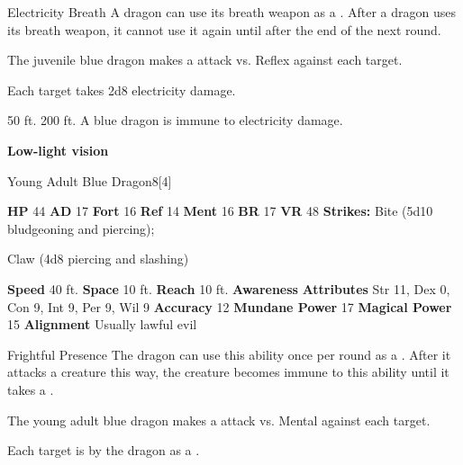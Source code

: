     \begin{freeability}{Electricity Breath}
      A dragon can use its breath weapon as a .
      After a dragon uses its breath weapon, it cannot use it again until after the end of the next round.
      \par The juvenile blue dragon makes a  attack
        vs. Reflex against each target.
    
    \hit Each target takes 2d8 electricity damage.
    \end{freeability}
  
      
       50 ft.
     200 ft.
     A blue dragon is immune to electricity damage.
    \par\noindent\textbf{Low-light vision}
  

  \begin{monsubsection}{Young Adult Blue Dragon}{8}[4]
    \vspace{-1em}\vspace{-1em}
    \vspace{0em}

    
    

    \begin{spellcontent}
      \begin{spelltargetinginfo}
        \pari \textbf{HP} 44 \monsep
          \textbf{AD} 17 \monsep
          \textbf{Fort} 16 \monsep
          \textbf{Ref} 14 \monsep
          \textbf{Ment} 16
        \pari \textbf{BR} 17 \monsep
        \textbf{VR} 48
        \pari \textbf{Strikes:}
            Bite  (5d10 bludgeoning and piercing);
\par Claw  (4d8 piercing and slashing)
      \end{spelltargetinginfo}
    \end{spellcontent}
    \begin{monsterfooter}
      \pari \textbf{Speed} 40 ft. \monsep
        \textbf{Space} 10 ft. \monsep
        \textbf{Reach} 10 ft.
      \pari \textbf{Awareness} 
      \pari \textbf{Attributes}
        Str 11, Dex 0,
        Con 9, Int 9,
        Per 9, Wil 9
      \pari \textbf{Accuracy} 12 \monsep
        \textbf{Mundane Power} 17 \monsep
      \textbf{Magical Power} 15
      \pari \textbf{Alignment} Usually lawful evil
    \end{monsterfooter}
  \end{monsubsection}
  \begin{freeability}{Frightful Presence}
      The dragon can use this ability once per round as a .
      After it attacks a creature this way, the creature becomes immune to this ability until it takes a .
      \par The young adult blue dragon makes a  attack
        vs. Mental against each target.
    
    \hit Each target is  by the dragon as a .
    \end{freeability}
  

